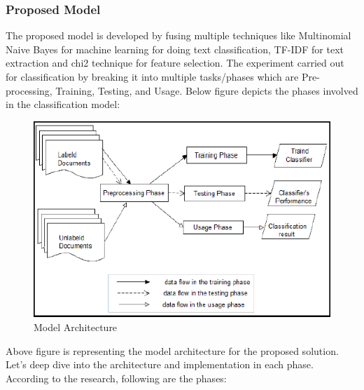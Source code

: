 \subsubsection{Proposed Model}
The proposed model is developed by fusing multiple techniques like Multinomial Naive Bayes for machine learning for doing text classification, TF-IDF for text extraction and chi2 technique for feature selection. The experiment carried out for classification by breaking it into multiple tasks/phases which are Pre-processing, Training, Testing, and Usage. Below figure depicts the phases involved in the classification model:
\begin{figure}[H]
\centering
\includegraphics[scale=0.9]{images/Chapter1/RW1.PNG}
\caption{Model Architecture \cite{rw1}}
\label{rw1-model-arch}
\end{figure}
\par
Above figure is representing the model architecture for the proposed solution. Let's deep dive into the architecture and implementation in each phase. According to the research, following are the phases:
